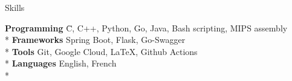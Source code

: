 \documentclass{article}
\newlength{\tabin}
\newlength{\secsep}
\newcommand{\lineunder}{\vspace*{-8pt} \\ \hspace*{-6pt} \hrulefill \\ \vspace*{-15pt}}
\newenvironment{tabbedsection}[1]{
  \begin{list}{}{
      \setlength{\itemsep}{0pt}
      \setlength{\labelsep}{0pt}
      \setlength{\labelwidth}{0pt}
      \setlength{\leftmargin}{\tabin}
      \setlength{\rightmargin}{\tabin}
      \setlength{\listparindent}{0pt}
      \setlength{\parsep}{0pt}
      \setlength{\parskip}{0pt}
      \setlength{\partopsep}{0pt}
      \setlength{\topsep}{#1}
    }
  \item[]
}{\end{list}}
\newenvironment{nospacetabbing}{
    \begin{tabbing}
}{\end{tabbing}\vspace{-1.2em}}
\newenvironment{resume_section}[1]{
  \filbreak
  \vspace{2\secsep}
  \textsc{\large#1}
  \lineunder
  \begin{tabbedsection}{\secsep}
}{\end{tabbedsection}}
\begin{document}
\begin{resume_section}{Skills}
  \begin{nospacetabbing}

  \textbf{Programming}  \= C, C++, Python, Go, Java, Bash scripting, MIPS assembly\\*
  \textbf{Frameworks} \> Spring Boot, Flask, Go-Swagger\\*
  \textbf{Tools} \> Git, Google Cloud, \LaTeX, Github Actions \\*
  \textbf{Languages} \> English, French\\*
  \end{nospacetabbing}
\end{resume_section}
\end{document}
